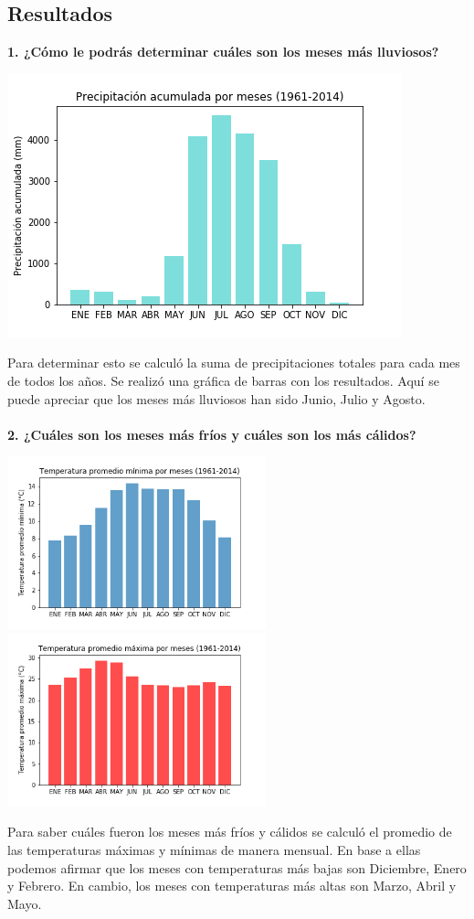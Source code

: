 \documentclass[12pt]{article}
\begin{document}
\subsection{Resultados}
\noindent\textbf {1. ¿Cómo le podrás determinar cuáles son los meses más lluviosos?} \\
\begin{center}
\includegraphics[scale=0.65]{Precipit_mensual.png}
\end{center}
Para determinar esto se calculó la suma de precipitaciones totales para cada mes de todos los años. Se realizó una gráfica de barras con los resultados. Aquí se puede apreciar que los meses más lluviosos han sido Junio, Julio y Agosto.\\\\

\noindent\textbf {2. ¿Cuáles son los meses más fríos y cuáles son los más cálidos?} \\
\begin{center}
\includegraphics[height=5cm]{Temperaturaprommin_mensual.png}
\hspace*{\fill}
\includegraphics[height=5cm]{Temperaturapromax_mensual.png}
\end{center}
Para saber cuáles fueron los meses más fríos y cálidos se calculó el promedio de las temperaturas máximas y mínimas de manera mensual. 
En base a ellas podemos afirmar que los meses con temperaturas más bajas son Diciembre, Enero y Febrero. 
En cambio, los meses con temperaturas más altas son Marzo, Abril y Mayo.
\\
\end{document}
